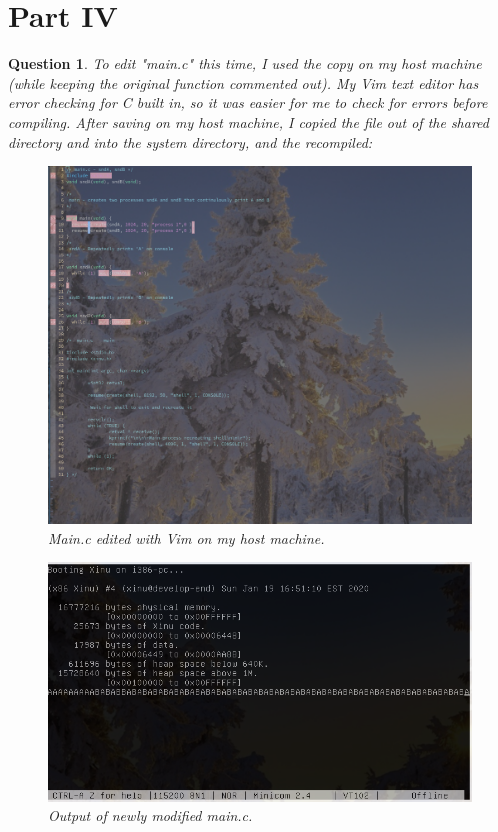 \documentclass{article}
\newtheorem{theorem}{Question}
\begin{document}
\section{Part IV}
\begin{theorem}
To edit "main.c" this time, I used the copy on my host machine (while keeping the original function commented out). My Vim text
editor has error checking for C built in, so it was easier for me to check for errors before compiling. After saving on 
my host machine, I copied the file out of the shared directory and into the system directory, and the recompiled:
\begin{figure}[ht!]
  \includegraphics[width=\textwidth]{mainmod2.png}
  \caption{Main.c edited with Vim on my host machine.}
\end{figure}
\begin{figure}[ht!]
  \includegraphics[width=\textwidth]{mainout.png}
  \caption{Output of newly modified main.c.}
\end{figure}
\end{theorem}
\end{document}
